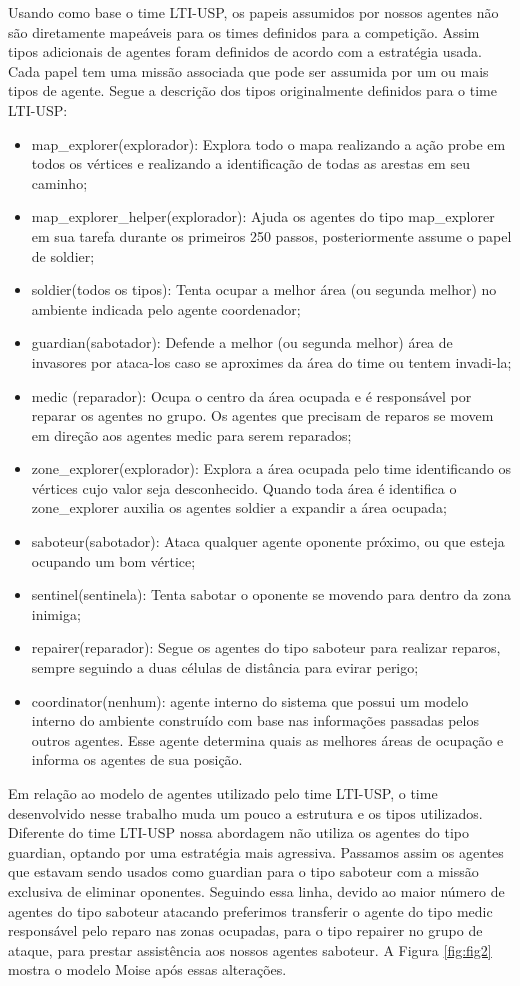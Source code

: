 \documentclass{llncs}
\begin{document}
Usando como base o time LTI-USP, os papeis assumidos por nossos agentes não são diretamente mapeáveis para os times definidos para a competição. Assim tipos adicionais de agentes foram definidos de acordo com a estratégia usada. Cada papel tem uma missão associada que pode ser assumida por um ou mais tipos de agente. Segue a descrição dos tipos originalmente definidos para o time LTI-USP:
\begin{itemize}
  \item map\_explorer(explorador): Explora todo o mapa realizando a ação probe em todos os vértices e realizando a identificação de todas as arestas em seu caminho;
  \item map\_explorer\_helper(explorador): Ajuda os agentes do tipo map\_explorer em sua tarefa durante os primeiros 250 passos, posteriormente assume o papel de soldier;
  \item soldier(todos os tipos): Tenta ocupar a melhor área (ou segunda melhor) no ambiente indicada pelo agente coordenador;
  \item guardian(sabotador): Defende a melhor (ou segunda melhor) área de invasores por ataca-los caso se aproximes da área do time ou tentem invadi-la;
  \item medic (reparador): Ocupa o centro da área ocupada e é responsável por reparar os agentes no grupo. Os agentes que precisam de reparos se movem em direção aos agentes medic para serem reparados;
  \item zone\_explorer(explorador): Explora a área ocupada pelo time identificando os vértices cujo valor seja desconhecido. Quando toda área é identifica o zone\_explorer auxilia os agentes soldier a expandir a área ocupada;
  \item saboteur(sabotador): Ataca qualquer agente oponente próximo, ou que esteja ocupando um bom vértice;
  \item sentinel(sentinela): Tenta sabotar o oponente se movendo para dentro da zona inimiga;
  \item repairer(reparador): Segue os agentes do tipo saboteur para realizar reparos, sempre seguindo a duas células de distância para evirar perigo;
  \item coordinator(nenhum): agente interno do sistema que possui um modelo interno do ambiente construído com base nas informações passadas pelos outros agentes. Esse agente determina quais as melhores áreas de ocupação e informa os agentes de sua posição.
\end{itemize}

Em relação ao modelo de agentes utilizado pelo time LTI-USP, o time desenvolvido nesse trabalho muda um pouco a estrutura e os tipos utilizados. Diferente do time LTI-USP nossa abordagem não utiliza os agentes do tipo guardian, optando por uma estratégia mais agressiva. Passamos assim os agentes que estavam sendo usados como guardian para o tipo saboteur com a missão exclusiva de eliminar oponentes. Seguindo essa linha, devido ao maior número de agentes do tipo saboteur atacando preferimos transferir o agente do tipo medic responsável pelo reparo nas zonas ocupadas, para o tipo repairer no grupo de ataque, para prestar assistência aos nossos agentes saboteur. A Figura \ref{fig:fig2} mostra o modelo Moise após essas alterações.
\end{document}
